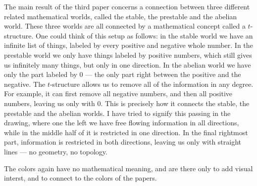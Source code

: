 The main result of the third paper concerns a connection between three different related mathematical worlds, called the stable, the prestable and the abelian world. These three worlds are all connected by a mathematical concept called a $t$-structure. One could think of this setup as follows: in the stable world we have an infinite list of things, labeled by every positive and negative whole number. In the prestable world we only have things labeled by positive numbers, which still gives us infinitely many things, but only in one direction. In the abelian world we have only the part labeled by $0$ --- the only part right between the positive and the negative. The $t$-structure allows us to remove all of the information in any degree. For example, it can first remove all negative numbers, and then all positive numbers, leaving us only with $0$. This is precisely how it connects the stable, the prestable and the abelian worlds. I have tried to signify this passing in the drawing, where one the left we have free flowing information in all directions, while in the middle half of it is restricted in one direction. In the final rightmost part, information is restricted in both directions, leaving us only with straight lines --- no geometry, no topology. 

The colors again have no mathematical meaning, and are there only to add visual interst, and to connect to the colors of the papers. 

\newpage